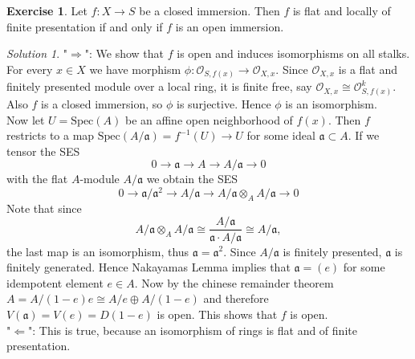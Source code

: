 \documentclass[10pt]{article}
\theoremstyle{definition}
\newtheorem{exercise}{Exercise}
\theoremstyle{remark}
\newtheorem*{solution}{Solution}
\newcommand{\Sp}{\text{Spec}}
\begin{document}
\begin{exercise}
Let $f: X \rightarrow S$ be a closed immersion. Then $f$ is flat and locally of finite presentation if and only if $f$ is an open immersion.
\end{exercise}
\begin{solution}
"$\Rightarrow$": We show that $f$ is open and induces isomorphisms on all stalks.
For every $x\in X$ we have morphism $ \phi : \mathcal{O}_{S,f(x)} \rightarrow \mathcal{O}_{X,x}$. Since $\mathcal{O}_{X,x}$ is a flat and finitely presented module over a local ring, it is finite free, say $\mathcal{O}_{X,x} \cong \mathcal{O}_{S,f(x)}^k$. Also $f$ is a closed immersion, so $\phi$ is surjective. Hence $\phi$ is an isomorphism.\\
Now let $U=\Sp ( A)$ be an affine open neighborhood of $f(x)$. Then $f$ restricts to a map $\Sp (A / \mathfrak{a}) = f^{-1}(U) \rightarrow U$ for some ideal $\mathfrak{a} \subset A$. If we tensor the SES
$$ 0 \rightarrow \mathfrak{a} \rightarrow A \rightarrow A / \mathfrak{a} \rightarrow 0$$
with the flat $A$-module $A/ \mathfrak{a}$ we obtain the SES
$$ 0 \rightarrow \mathfrak{a} / \mathfrak{a}^2 \rightarrow A / \mathfrak{a} \rightarrow A / \mathfrak{a} \otimes_A A/ \mathfrak{a} \rightarrow 0$$
Note that since $$A / \mathfrak{a} \otimes_A A/ \mathfrak{a} \cong \frac{A / \mathfrak{a}}{\mathfrak{a} \cdot A / \mathfrak{a} } \cong A / \mathfrak{a},$$ the last map is an isomorphism, thus $\mathfrak{a} = \mathfrak{a}^2$.
Since $A / \mathfrak{a}$ is finitely presented, $\mathfrak{a}$ is finitely generated. Hence Nakayamas Lemma implies that  $\mathfrak{a} = (e)$ for some idempotent element $ e\in A$.  Now by the chinese remainder theorem $A = A / (1-e)e \cong A / e \oplus A / (1-e)$ and therefore $V(\mathfrak{a}) = V(e) = D(1-e)$ is open. This shows that $f$ is open.\\

"$\Leftarrow$": This is true, because an isomorphism of rings is flat and of finite presentation.

\end{solution}
\end{document}
